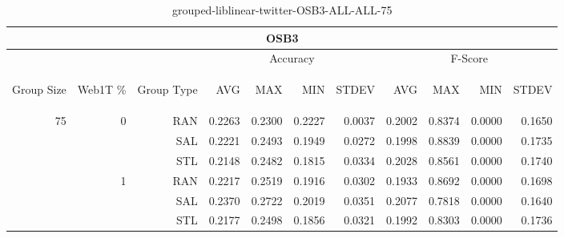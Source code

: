 \begin{center}
\begin{table}[htbp] 
 \begin{center}
\begin{tabular}{ | r | r | r | r | r | r | r | r | r | r | r |}
\hline
\multicolumn{11}{|c|}{OSB3}\\
\hline
 & & & \multicolumn{4}{|c|}{Accuracy} & \multicolumn{4}{|c|}{F-Score}\\ \cline{4-11}
\begin{sideways}Group Size\end{sideways} & \begin{sideways}Web1T \%\end{sideways} & \begin{sideways}Group Type\end{sideways} & \begin{sideways}AVG\end{sideways} & \begin{sideways}MAX\end{sideways} & \begin{sideways}MIN\end{sideways} & \begin{sideways}STDEV\end{sideways} & \begin{sideways}AVG\end{sideways} & \begin{sideways}MAX\end{sideways} & \begin{sideways}MIN\end{sideways} & \begin{sideways}STDEV\end{sideways}\\
\hline
\multirow{6}{*}{75}
 & \multirow{3}{*}{0} & RAN & 0.2263 & 0.2300 & 0.2227 & 0.0037 & 0.2002 & 0.8374 & 0.0000 & 0.1650\\ \cline{3-11}
 &   & SAL & 0.2221 & 0.2493 & 0.1949 & 0.0272 & 0.1998 & 0.8839 & 0.0000 & 0.1735\\ \cline{3-11}
 &   & STL & 0.2148 & 0.2482 & 0.1815 & 0.0334 & 0.2028 & 0.8561 & 0.0000 & 0.1740\\ \cline{2-11}
 & \multirow{3}{*}{1} & RAN & 0.2217 & 0.2519 & 0.1916 & 0.0302 & 0.1933 & 0.8692 & 0.0000 & 0.1698\\ \cline{3-11}
 &   & SAL & 0.2370 & 0.2722 & 0.2019 & 0.0351 & 0.2077 & 0.7818 & 0.0000 & 0.1640\\ \cline{3-11}
 &   & STL & 0.2177 & 0.2498 & 0.1856 & 0.0321 & 0.1992 & 0.8303 & 0.0000 & 0.1736\\ \cline{2-11}
\hline
\end{tabular}
\caption{grouped-liblinear-twitter-OSB3-ALL-ALL-75}
\end{center}
 \end{table}
\end{center}

